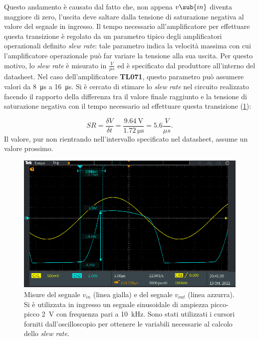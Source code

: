 Questo andamento è causato dal fatto che, non appena $v\sub{in}$ diventa maggiore di zero, l'uscita deve saltare dalla tensione di saturazione negativa al valore del segnale in ingresso. Il tempo necessario all'amplificatore per effettuare questa transizione è regolato da un parametro tipico degli amplificatori operazionali definito \textit{slew rate}: tale parametro indica la velocità massima con cui l'amplificatore operazionale può far variare la tensione alla sua uscita. Per questo motivo, lo \textit{slew rate} è misurato in $\frac{V}{\mu s}$ ed è specificato dal produttore all'interno del datasheet. Nel caso dell'amplificatore \textbf{TL071}, questo parametro può assumere valori da \SI{8}{\micro\second} a \SI{16}{\micro\second}. Si è cercato di stimare lo \textit{slew rate} nel circuito realizzato facendo il rapporto della differenza tra il valore finale raggiunto e la tensione di saturazione negativa con il tempo necessario ad effettuare questa transizione (\Fig\ref{fig:slewratevolt}):

\begin{equation}
	SR=\frac{\delta V}{\delta t}=\frac{\SI{9.64}{\volt}}{\SI{1.72}{\micro\second}}=5. 6\frac{V}{\mu s}.
\end{equation}
Il valore, pur non rientrando nell'intervallo specificato nel datasheet, assume un valore prossimo.
\begin{figure}[tbh]
	\centering
	\includegraphics[width=\linewidth]{./ImageFiles/Laboratorio 2/TEK00040.PNG}
	\caption{Misure del segnale $v_{in}$ (linea gialla) e del segnale $v_{out}$ (linea azzurra). Si è utilizzata in ingresso un segnale sinusoidale di ampiezza picco-picco \SI{2}{\volt} con frequenza pari a \SI{10}{\kilo\hertz}. Sono stati utilizzati i cursori forniti dall'oscilloscopio per ottenere le variabili necessarie al calcolo dello \textit{slew rate}.}
	\label{fig:slewratevolt}
\end{figure}

